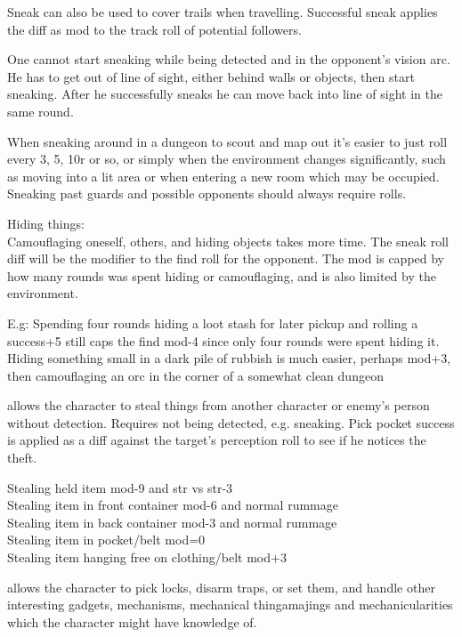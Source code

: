 Sneak can also be used to cover trails when travelling. Successful sneak applies the diff as mod to the track roll of potential followers.

One cannot start sneaking while being detected and in the opponent's vision arc. He has to get out of line of sight, either behind walls or objects, then start sneaking. After he successfully sneaks he can move back into line of sight in the same round.

When sneaking around in a dungeon to scout and map out it's easier to just roll every 3, 5, 10r or so, or simply when the environment changes significantly, such as moving into a lit area or when entering a new room which may be occupied. Sneaking past guards and possible opponents should always require rolls.

Hiding things:\\
Camouflaging oneself, others, and hiding objects takes more time. The sneak roll diff will be the modifier to the find roll for the opponent. The mod is capped by how many rounds was spent hiding or camouflaging, and is also limited by the environment.

E.g: Spending four rounds hiding a loot stash for later pickup and rolling a success+5 still caps the find mod-4 since only four rounds were spent hiding it.
Hiding something small in a dark pile of rubbish is much easier, perhaps mod+3, then camouflaging an orc in the corner of a somewhat clean dungeon


 allows the character to steal things from another character or enemy's person without detection. Requires not being detected, e.g. sneaking. Pick pocket success is applied as a diff against the target's perception roll to see if he notices the theft.

Stealing held item mod-9 and str vs str-3 \\
Stealing item in front container mod-6 and normal rummage \\
Stealing item in back container mod-3 and normal rummage \\
Stealing item in pocket/belt mod=0 \\
Stealing item hanging free on clothing/belt mod+3


 allows the character to pick locks, disarm traps, or set them, and handle other interesting gadgets, mechanisms, mechanical thingamajings and mechanicularities which the character might have knowledge of.

